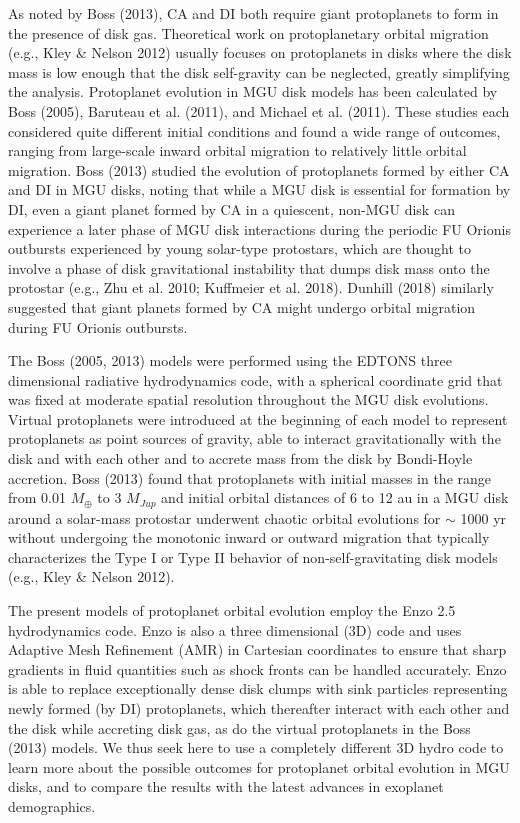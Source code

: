 \documentclass[12pt,preprint]{aastex}
\begin{document}
  As noted by Boss (2013), CA and DI both require giant protoplanets to form in the presence of disk gas. 
Theoretical work on protoplanetary orbital migration (e.g., Kley \& Nelson 2012) usually focuses on 
protoplanets in disks where the disk mass is low enough that the disk self-gravity can be neglected, greatly
simplifying the analysis. Protoplanet evolution in MGU disk models has been calculated by Boss (2005), 
Baruteau et al. (2011), and Michael et al. (2011). These studies each considered quite different initial 
conditions and found a wide range of outcomes, ranging from large-scale inward orbital migration to 
relatively little orbital migration. Boss (2013) studied the evolution of protoplanets formed by either
CA and DI in MGU disks, noting that while a MGU disk is essential for formation by DI, even a giant planet
formed by CA in a quiescent, non-MGU disk can experience a later phase of MGU disk interactions during the 
periodic FU Orionis outbursts experienced by young solar-type protostars, which are thought to involve a phase of 
disk gravitational instability that dumps disk mass onto the protostar (e.g., Zhu et al. 2010; Kuffmeier et al. 2018). 
Dunhill (2018) similarly suggested that giant planets formed by CA might undergo orbital migration during 
FU Orionis outbursts. 

 The Boss (2005, 2013) models were performed using the EDTONS three dimensional radiative hydrodynamics code, 
with a spherical coordinate grid that was fixed at moderate spatial resolution throughout the MGU disk evolutions.
Virtual protoplanets were introduced at the beginning of each model to represent protoplanets as point
sources of gravity, able to interact gravitationally with the disk and with each other and to accrete mass from the disk by
Bondi-Hoyle accretion. Boss (2013) found that protoplanets with initial masses in the range from 
0.01 $M_\oplus$ to 3 $M_{Jup}$ and initial orbital distances of 6 to 12 au in a MGU disk 
around a solar-mass protostar underwent chaotic orbital evolutions for $\sim$ 1000 yr 
without undergoing the monotonic inward or outward migration that typically characterizes the Type I or 
Type II behavior of non-self-gravitating disk models (e.g., Kley \& Nelson 2012).

 The present models of protoplanet orbital evolution employ the Enzo 2.5 hydrodynamics code. 
Enzo is also a three dimensional (3D) code and uses Adaptive Mesh Refinement (AMR) in Cartesian coordinates
to ensure that sharp gradients in fluid quantities such as shock fronts can be handled accurately. 
Enzo is able to replace exceptionally dense disk clumps with sink particles representing newly formed (by DI)
protoplanets, which thereafter interact with each other and the disk while accreting disk gas, as do
the virtual protoplanets in the Boss (2013) models. We thus seek here to use a completely different 3D hydro code to
learn more about the possible outcomes for protoplanet orbital evolution in MGU disks, and to compare
the results with the latest advances in exoplanet demographics.
 
\end{document}
